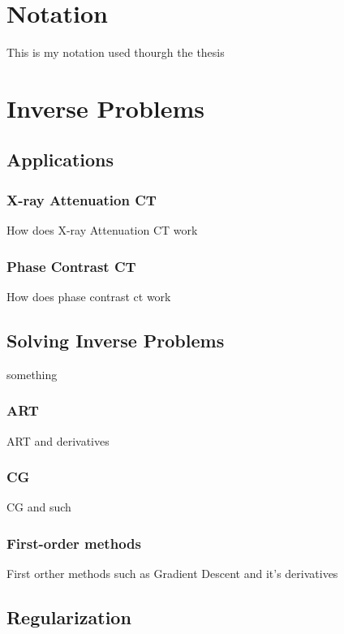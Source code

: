 \chapter{Notation}

This is my notation used thourgh the thesis

\chapter{Inverse Problems}

\section{Applications}
 
\subsection{X-ray Attenuation CT}

How does X-ray Attenuation CT work

\subsection{Phase Contrast CT}

How does phase contrast ct work

\section{Solving Inverse Problems}
 
something

\subsection{ART}

ART and derivatives

\subsection{CG}

CG and such
 
\subsection{First-order methods}

First orther methods such as Gradient Descent and it's derivatives

\section{Regularization}

